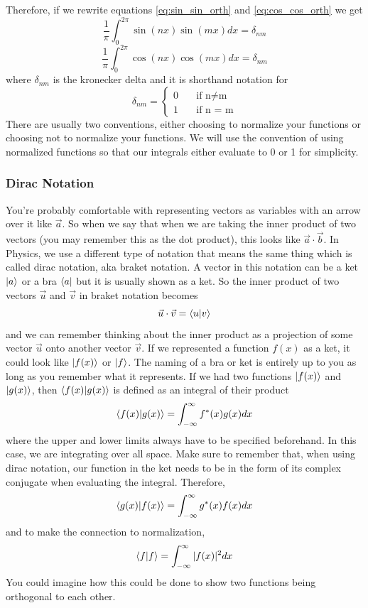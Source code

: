 \documentclass{article}
\newcommand{\be}{\begin{equation}}
\newcommand{\ee}{\end{equation}}
\begin{document}
Therefore, if we rewrite equations \ref{eq:sin_sin_orth} and \ref{eq:cos_cos_orth} we get
\be \label{eq:sin_sin_orthonorm}
  \frac{1}{\pi} \int_0^{2\pi} \sin(nx)\sin(mx) dx = \delta_{nm}
\ee
\be \label{eq:cos_cos_orthonorm}
  \frac{1}{\pi} \int_0^{2\pi} \cos(nx)\cos(mx) dx = \delta_{nm}
\ee
where $\delta_{nm}$ is the kronecker delta and it is shorthand notation for
\be
\delta_{nm} =
  \left\{
    \begin{array}{ll}
      0 & \quad \text{if n} \neq \text{m} \\
      1 & \quad \text{if n = m}
    \end{array}
  \right.
\ee
There are usually two conventions, either choosing to normalize your functions or choosing not to normalize your functions.
We will use the convention of using normalized functions so that our integrals either evaluate to 0 or 1 for simplicity.

\subsubsection*{Dirac Notation}
You're probably comfortable with representing vectors as variables with an arrow over it like $\vec{a}$.
So when we say that when we are taking the inner product of two vectors (you may remember this as the dot product), this looks like $\vec{a} \cdot \vec{b}$.
In Physics, we use a different type of notation that means the same thing which is called dirac notation, aka braket notation.
A vector in this notation can be a ket $\ket{a}$ or a bra $\bra{a}$ but it is usually shown as a ket.
So the inner product of two vectors $\vec{u}$ and $\vec{v}$ in braket notation becomes
\be
  \vec{u} \cdot \vec{v} = \braket{u|v}
\ee
and we can remember thinking about the inner product as a projection of some vector $\vec{u}$ onto another vector $\vec{v}$.
If we represented a function $f(x)$ as a ket, it could look like $\ket{f(x)}$ or $\ket{f}$.
The naming of a bra or ket is entirely up to you as long as you remember what it represents.
If we had two functions $\ket{f(x)}$ and $\ket{g(x)}$, then $\braket{f(x)|g(x)}$ is defined as an integral of their product
\be
  \braket{f(x)|g(x)} = \int_{- \infty}^{\infty} f^*(x) g(x) dx
\ee
where the upper and lower limits always have to be specified beforehand.
In this case, we are integrating over all space.
Make sure to remember that, when using dirac notation, our function in the ket needs to be in the form of its complex conjugate when evaluating the integral.
Therefore,
\be
  \braket{g(x)|f(x)} = \int_{- \infty}^{\infty} g^*(x) f(x) dx
\ee
and to make the connection to normalization,
\be
  \braket{f|f} = \int_{- \infty}^{\infty} |f(x)|^2 dx
\ee
You could imagine how this could be done to show two functions being orthogonal to each other.
\end{document}
